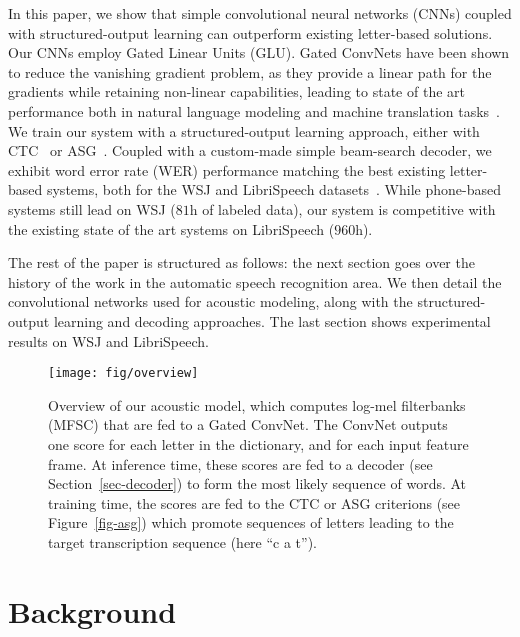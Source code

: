 \documentclass{article}
\begin{document}
In this paper, we show that simple convolutional neural networks (CNNs)
coupled with structured-output learning can outperform existing letter-based
solutions. Our CNNs employ Gated Linear Units (GLU). Gated ConvNets have
been shown to reduce the vanishing gradient problem, as they provide a
linear path for the gradients while retaining non-linear capabilities,
leading to state of the art performance both in natural language modeling
and machine translation tasks~\citep{dauphin2017lm,gehring2017mt}. We train
our system with a structured-output learning approach, either with
CTC~\citep{graves2006connectionist} or ASG~\citep{collobert2016wav2letter}.
Coupled with a custom-made simple beam-search decoder, we exhibit word
 error rate (WER) performance matching the best existing letter-based
 systems, both for the WSJ and LibriSpeech datasets~\citep{panayotov2015librispeech}. 
 While phone-based systems still
lead on WSJ ($81$h of labeled data), our system is competitive with the
existing state of the art systems on LibriSpeech ($960$h).


The rest of the paper is structured as follows: the next section goes over
the history of the work in the automatic speech recognition area.
We then detail the convolutional
networks used for acoustic modeling, along with the structured-output
learning and decoding approaches. The last section shows experimental
results on WSJ and LibriSpeech.







\begin{figure*}
  \vspace*{-0.3cm}
  \centering
\texttt{[image: fig/overview]}
  \caption{
    \label{fig-overview}
    Overview of our acoustic model, which computes log-mel filterbanks (MFSC) that are
    fed to a Gated ConvNet. The ConvNet outputs one score for each letter in
    the dictionary, and for each input feature frame. At inference time, these
    scores are fed to a decoder (see Section~\ref{sec-decoder}) to form
    the most likely sequence of words. At training time, the scores are fed
    to the CTC or ASG criterions (see Figure~\ref{fig-asg}) which promote
    sequences of letters leading to the target transcription sequence (here ``c a
    t'').
  }
\end{figure*}


\section{Background}
\end{document}
